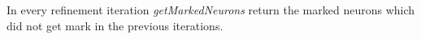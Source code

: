 \begin{theorem}
  \label{th:progress2}
  In every refinement iteration {\em getMarkedNeurons} return the marked neurons which did not get mark in the previous iterations. 
\end{theorem}













